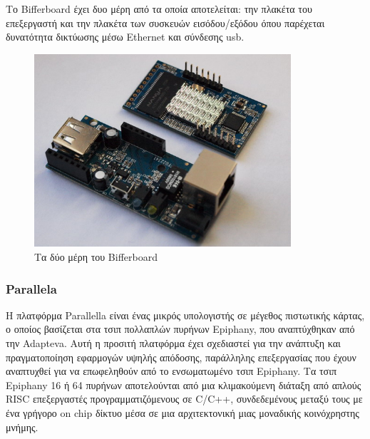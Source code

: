 \documentclass[12pt, a4paper, oneside]{report}
\begin{document}
Το Bif\mbox{}ferboard έχει δυο μέρη από τα οποία αποτελείται: την πλακέτα του επεξεργαστή και την πλακέτα των συσκευών εισόδου\slash εξόδου όπου παρέχεται δυνατότητα δικτύωσης μέσω Ethernet και σύνδεσης usb.
\begin{figure}[!h]
\centering
\includegraphics[width=0.85\textwidth]{img_bifferboard}
\caption[Τα δύο μέρη του Bif\mbox{}ferboard]{Τα δύο μέρη του Bif\mbox{}ferboard\cite{bifferboard}}
\end{figure}

\subsubsection{Parallela}

Η πλατφόρμα Parallella είναι ένας μικρός υπολογιστής σε μέγεθος πιστωτικής κάρτας, ο οποίος βασίζεται στα τσιπ πολλαπλών πυρήνων Epiphany, που αναπτύχθηκαν από την Adapteva. Αυτή η προσιτή πλατφόρμα έχει σχεδιαστεί για την ανάπτυξη και πραγματοποίηση εφαρμογών υψηλής απόδοσης, παράλληλης επεξεργασίας που έχουν αναπτυχθεί για να επωφεληθούν από το ενσωματωμένο τσιπ Epiphany. Τα τσιπ Epiphany 16 ή 64 πυρήνων αποτελούνται από μια κλιμακούμενη διάταξη από απλούς RISC επεξεργαστές προγραμματιζόμενους σε C\slash C++, συνδεδεμένους μεταξύ τους με ένα γρήγορο on chip δίκτυο μέσα σε μια αρχιτεκτονική μιας μοναδικής κοινόχρηστης μνήμης.
\end{document}
